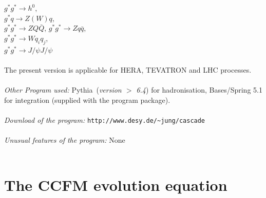 \documentclass[11pt]{article} \usepackage{mystyle-new}
\def\PYTHIA{{\sc Pythia}}
\begin{document}
$ g^* g^* \rightarrow h^0$,\\
$g^* q \to Z(W)  q$, \\
$g^* g^* \to Z Q \bar{Q} $, $g^* g^* \to Z q \bar{q} $, \\
$g^* g^* \to W q_i q_j$,\\
$ g^* g^* \to J/\psi J/\psi  $
\\ \\
The
present version is applicable for HERA, TEVATRON and LHC processes. \\ \\
{\em Other Program used:}  \PYTHIA\ ({\it version $>$ 6.4}) for hadronisation, 
{\sc Bases/Spring}  5.1 
for integration (supplied with the program package).\\ \\ 
{\em Download of the program:} \verb+http://www.desy.de/~jung/cascade+\\ \\
{\em Unusual features of the program:}   None \\ \\
\newpage

\section{The CCFM evolution equation}
\label{sec:CCFMEquation}
\end{document}
